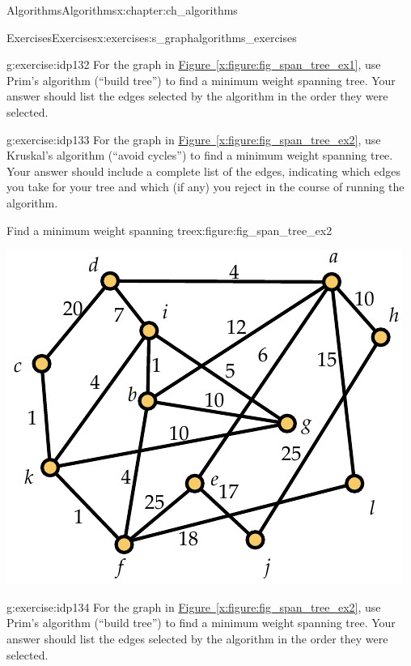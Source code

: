 \documentclass[oneside,10pt,]{book}
\newcommand{\xreffont}{\relax}
\numberwithin{equation}{section}
\begin{document}
\begin{chapterptx}{Algorithms}{}{Algorithms}{}{}{x:chapter:ch_algorithms}
\begin{exercises-section}{Exercises}{}{Exercises}{}{}{x:exercises:s_graphalgorithms_exercises}
\begin{divisionexercise}{2}{}{}{g:exercise:idp132}%
For the graph in \hyperref[x:figure:fig_span_tree_ex1]{Figure~{\xreffont\ref{x:figure:fig_span_tree_ex1}}}, use Prim's algorithm (``build tree'') to find a minimum weight spanning tree. Your answer should list the edges selected by the algorithm in the order they were selected.%
\end{divisionexercise}%
\begin{divisionexercise}{3}{}{}{g:exercise:idp133}%
For the graph in \hyperref[x:figure:fig_span_tree_ex2]{Figure~{\xreffont\ref{x:figure:fig_span_tree_ex2}}}, use Kruskal's algorithm (``avoid cycles'') to find a minimum weight spanning tree. Your answer should include a complete list of the edges, indicating which edges you take for your tree and which (if any) you reject in the course of running the algorithm.%
\begin{figureptx}{Find a minimum weight spanning tree}{x:figure:fig_span_tree_ex2}{}%
\begin{image}{0.175}{0.65}{0.175}%
\includegraphics[width=\linewidth]{images/span_tree_ex2}
\end{image}%
\tcblower
\end{figureptx}%
\end{divisionexercise}%
\begin{divisionexercise}{4}{}{}{g:exercise:idp134}%
For the graph in \hyperref[x:figure:fig_span_tree_ex2]{Figure~{\xreffont\ref{x:figure:fig_span_tree_ex2}}}, use Prim's algorithm (``build tree'') to find a minimum weight spanning tree. Your answer should list the edges selected by the algorithm in the order they were selected.%

\end{divisionexercise}
\end{exercises-section}
\end{chapterptx}
\end{document}
